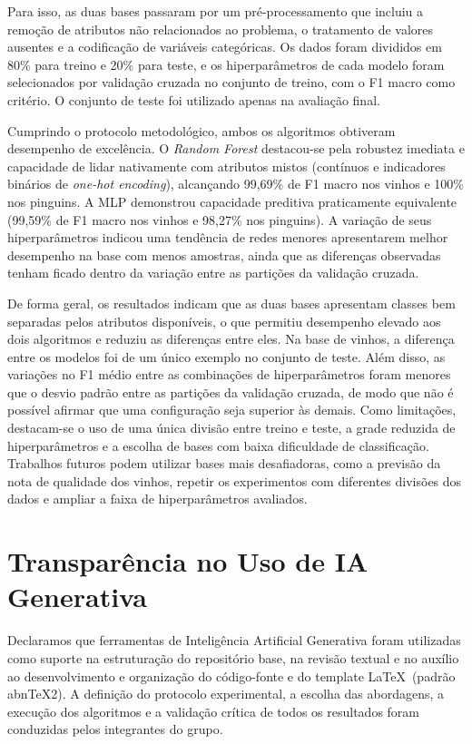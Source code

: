 \documentclass[12pt, oneside, a4paper, english, brazilian]{abntex2}
\begin{document}
Para isso, as duas bases passaram por um pré-processamento que incluiu a remoção de atributos não relacionados ao problema, o tratamento de valores ausentes e a codificação de variáveis categóricas. Os dados foram divididos em 80\% para treino e 20\% para teste, e os hiperparâmetros de cada modelo foram selecionados por validação cruzada no conjunto de treino, com o F1 macro como critério. O conjunto de teste foi utilizado apenas na avaliação final.

Cumprindo o protocolo metodológico, ambos os algoritmos obtiveram desempenho de excelência. O \textit{Random Forest} destacou-se pela robustez imediata e capacidade de lidar nativamente com atributos mistos (contínuos e indicadores binários de \textit{one-hot encoding}), alcançando 99,69\% de F1 macro nos vinhos e 100\% nos pinguins. A MLP demonstrou capacidade preditiva praticamente equivalente (99,59\% de F1 macro nos vinhos e 98,27\% nos pinguins). A variação de seus hiperparâmetros indicou uma tendência de redes menores apresentarem melhor desempenho na base com menos amostras, ainda que as diferenças observadas tenham ficado dentro da variação entre as partições da validação cruzada.

De forma geral, os resultados indicam que as duas bases apresentam classes bem separadas pelos atributos disponíveis, o que permitiu desempenho elevado aos dois algoritmos e reduziu as diferenças entre eles. Na base de vinhos, a diferença entre os modelos foi de um único exemplo no conjunto de teste. Além disso, as variações no F1 médio entre as combinações de hiperparâmetros foram menores que o desvio padrão entre as partições da validação cruzada, de modo que não é possível afirmar que uma configuração seja superior às demais. Como limitações, destacam-se o uso de uma única divisão entre treino e teste, a grade reduzida de hiperparâmetros e a escolha de bases com baixa dificuldade de classificação. Trabalhos futuros podem utilizar bases mais desafiadoras, como a previsão da nota de qualidade dos vinhos, repetir os experimentos com diferentes divisões dos dados e ampliar a faixa de hiperparâmetros avaliados.

\chapter{Transparência no Uso de IA Generativa}

Declaramos que ferramentas de Inteligência Artificial Generativa foram utilizadas como suporte na estruturação do repositório base, na revisão textual e no auxílio ao desenvolvimento e organização do código-fonte e do template \LaTeX\ (padrão abnTeX2). A definição do protocolo experimental, a escolha das abordagens, a execução dos algoritmos e a validação crítica de todos os resultados foram conduzidas pelos integrantes do grupo.

\postextual


\end{document}
